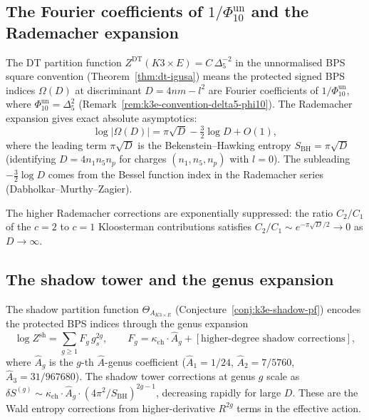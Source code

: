 \subsection{The Fourier coefficients of \texorpdfstring{$1/\Phi_{10}^{\mathrm{un}}$}{1/Phi-10-un} and the Rademacher expansion}
\label{subsec:k3e-rademacher}

The DT partition function \(Z^{\mathrm{DT}}(K3 \times E) = C\,\Delta_5^{-2}\) in the unnormalised BPS square convention (Theorem~\ref{thm:dt-igusa}) means the protected signed BPS indices \(\Omega(D)\) at discriminant \(D = 4nm - l^2\) are Fourier coefficients of \(1/\Phi_{10}^{\mathrm{un}}\), where \(\Phi_{10}^{\mathrm{un}}=\Delta_5^2\) (Remark~\ref{rem:k3e-convention-delta5-phi10}). The Rademacher expansion gives exact absolute asymptotics:
\begin{equation}
\label{eq:k3e-rademacher}
 \log|\Omega(D)| = \pi\sqrt{D} - \tfrac{3}{2} \log D + O(1),
\end{equation}
where the leading term $\pi\sqrt{D}$ is the Bekenstein--Hawking entropy $S_{\mathrm{BH}} = \pi\sqrt{D}$ (identifying $D = 4n_1 n_5 n_p$ for charges $(n_1, n_5, n_p)$ with $l = 0$). The subleading $-\frac{3}{2}\log D$ comes from the Bessel function index in the Rademacher series (Dabholkar--Murthy--Zagier).

The higher Rademacher corrections are exponentially suppressed: the ratio $C_2/C_1$ of the $c = 2$ to $c = 1$ Kloosterman contributions satisfies $C_2/C_1 \sim e^{-\pi\sqrt{D}/2} \to 0$ as $D \to \infty$.

\subsection{The shadow tower and the genus expansion}
\label{subsec:k3e-shadow-entropy}

The shadow partition function $\Theta_{A_{K3 \times E}}$ (Conjecture~\ref{conj:k3e-shadow-pf}) encodes the protected BPS indices through the genus expansion
\begin{equation}
\label{eq:k3e-genus-expansion}
 \log Z^{\mathrm{sh}} = \sum_{g \geq 1} F_g \, g_s^{2g},
 \qquad
 F_g = \kappa_{\mathrm{ch}} \cdot \hat{A}_g + [\text{higher-degree shadow corrections}],
\end{equation}
where $\hat{A}_g$ is the $g$-th $\hat{A}$-genus coefficient ($\hat{A}_1 = 1/24$, $\hat{A}_2 = 7/5760$, $\hat{A}_3 = 31/967680$). The shadow tower corrections at genus $g$ scale as $\delta S^{(g)} \sim \kappa_{\mathrm{ch}} \cdot \hat{A}_g \cdot (4\pi^2/S_{\mathrm{BH}})^{2g-1}$, decreasing rapidly for large $D$. These are the Wald entropy corrections from higher-derivative $R^{2g}$ terms in the effective action.

